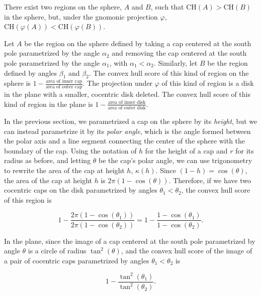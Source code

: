 {\begin{example}
  \begin{lemma}
    There exist two regions on the sphere, $A$ and $B$, such that
    $\mathrm{CH}(A) > \mathrm{CH}(B)$ in the sphere, but, under the
    gnomonic projection $\varphi$,
    $\mathrm{CH}(\varphi(A))<\mathrm{CH}(\varphi(B))$.
  \end{lemma}

  Let $A$ be the region on the sphere defined by taking a cap centered
  at the south pole parametrized by the angle $\alpha_2$ and removing
  the cap centered at the south pole parametrized by the angle
  $\alpha_1$, with $\alpha_1<\alpha_2$.  Similarly, let $B$ be the
  region defined by angles $\beta_1$ and $\beta_2$.  The convex hull
  score of this kind of region on the sphere is $1-\frac{\text{area of
  inner cap}}{\text{area of outer cap}}$.  The projection under
  $\varphi$ of this kind of region is a disk in the plane with
  a smaller, cocentric disk deleted.  The convex hull score of this kind
  of region in the plane is $1-\frac{\text{area of inner
  disk}}{\text{area of outer disk}}$.  

  In the previous section, we parametrized a cap on the sphere by its
  \textit{height}, but we can instead parametrize it by its
  \textit{polar angle}, which is the angle formed between the polar axis
  and a line segment connecting the center of the sphere with the
  boundary of the cap.  Using the notation of $h$ for the height of
  a cap and $r$ for its radius as before, and letting $\theta$ be the
  cap's polar angle, we can use trigonometry to rewrite the area of the
  cap at height $h$, $\kappa(h)$.  Since $(1-h)=\cos(\theta)$, the area
  of the cap at height $h$ is $2\pi (1-\cos(\theta))$.  Therefore, if we
  have two cocentric caps on the disk parametrized by angles
  $\theta_1<\theta_2$, the convex hull score of this region is 

  $$1-\frac{2\pi (1-\cos(\theta_1))}{2\pi (1-\cos(\theta_2))}
  = 1-\frac{1-\cos(\theta_1)}{1-\cos(\theta_2)}.$$

  In the plane, since the image of a cap centered at the south pole
  parametrized by angle $\theta$ is a circle of radius $\tan^2(\theta)$,
  and the convex hull score of the image of a pair of cocentric caps
  parametrized by angles $\theta_1<\theta_2$ is

  $$  1-\frac{\tan^2(\theta_1)}{\tan^2(\theta_2)}.  $$


\end{example}}
